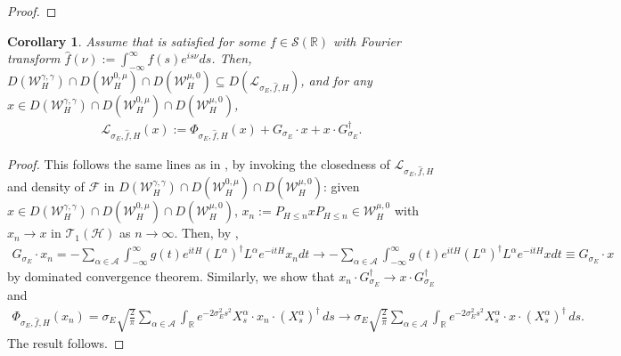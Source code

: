 \documentclass[11pt]{amsart}
\newcommand{\1}{\mathbbm{1}}
\newcommand{\cH}{\mathcal{H}}
\theoremstyle{plain}
\newtheorem{corollary}[theorem]{Corollary}
\theoremstyle{definition}
\theoremstyle{remark}
\numberwithin{equation}{section}
\begin{document}
\begin{proof}
\end{proof}

\begin{corollary}
 Assume that  is satisfied for some $f\in\mathcal{S}(\mathbb{R})$ with Fourier transform $\widehat{f}(\nu):=\int_{-\infty}^\infty f(s)e^{is\nu}ds$. Then, $D(\mathcal{W}_H^{\gamma,\gamma})\cap D(\mathcal{W}_H^{0,\mu})\cap D(\mathcal{W}_H^{\mu,0})\subseteq D(\mathcal{L}_{\sigma_E,\widehat{f},H})$, and for any $x\in D(\mathcal{W}_H^{\gamma,\gamma})\cap D(\mathcal{W}_H^{0,\mu})\cap D(\mathcal{W}_H^{\mu,0})$,
 \begin{align*}
\mathcal{L}_{\sigma_E,\widehat{f},H}(x):=\Phi_{\sigma_E,\widehat{f},H}(x)+G_{\sigma_E}\cdot x+x\cdot G_{\sigma_E}^\dagger.
 \end{align*}
\end{corollary}
\begin{proof}
This follows the same lines as in , by invoking the closedness of $\mathcal{L}_{\sigma_E,\widehat{f},H}$ and density of $\mathscr{F}$ in $D(\mathcal{W}_H^{\gamma,\gamma})\cap D(\mathcal{W}_H^{0,\mu})\cap D(\mathcal{W}_H^{\mu,0})$:
given  $x\in D(\mathcal{W}_H^{\gamma,\gamma})\cap D(\mathcal{W}_H^{0,\mu})\cap D(\mathcal{W}_H^{\mu,0})$, $x_n:=P_{H\le n}x P_{H\le n}\in \mathcal{W}_{H}^{\mu,0}$ with $x_n\to x$ in $\mathscr{T}_1(\cH)$ as $n\to\infty$. 
Then, by ,
\begin{align*}
G_{\sigma_E}\cdot x_n=-\sum_{\alpha\in\mathcal{A}} \int_{-\infty}^\infty g(t) e^{itH}(L^\alpha)^\dagger L^\alpha e^{-itH}x_n dt\to -\sum_{\alpha\in \mathcal{A}}\int_{-\infty}^\infty g(t) e^{itH}(L^\alpha)^\dagger L^\alpha e^{-itH}x dt\equiv G_{\sigma_E} \cdot x
\end{align*}
by dominated convergence theorem. Similarly, we show  that $x_n\cdot  G_{\sigma_E}^\dagger \to  x\cdot G_{\sigma_E}^\dagger$ and 
\begin{align*}
\Phi_{\sigma_E,\widehat{f},H}(x_n)=\sigma_E\sqrt{\frac{2}{\pi}}\sum_{\alpha\in\mathcal{A}}\int_{\mathbb{R}}e^{-2\sigma_E^2s^2} X_s^\alpha \cdot x_n\cdot  (X_s^\alpha)^\dagger \,ds\to \sigma_E\sqrt{\frac{2}{\pi}}\sum_{\alpha\in\mathcal{A}}\int_{\mathbb{R}}e^{-2\sigma_E^2s^2} X_s^\alpha \cdot x\cdot  (X_s^\alpha)^\dagger \,ds.
\end{align*}
The result follows.
\end{proof}
\end{document}
